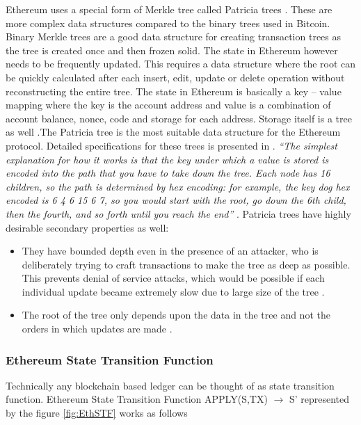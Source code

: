 Ethereum uses a special form of Merkle tree called Patricia trees \cite{ethwiki:007}. These are more complex data structures compared to the binary trees used in Bitcoin. Binary Merkle trees are a good data structure for creating transaction trees as the tree is created once and then frozen solid. The state in Ethereum however needs to be frequently updated. This requires a data structure where the root can be quickly calculated after each insert, edit, update or delete operation without reconstructing the entire tree. The state in Ethereum is basically a key – value mapping where the key is the account address and value is a combination of account balance, nonce, code and storage for each address. Storage itself is a tree as well \cite{misc:025}.The Patricia tree is the most suitable data structure for the Ethereum protocol. Detailed specifications for these trees is presented in \cite{ethwiki:007}. \textit{“The simplest explanation for how it works is that the key under which a value is stored is encoded into the path that you have to take down the tree. Each node has 16 children, so the path is determined by hex encoding: for example, the key dog hex encoded is 6 4 6 15 6 7, so you would start with the root, go down the 6th child, then the fourth, and so forth until you reach the end”} \cite{misc:025}. Patricia trees have highly desirable secondary properties as well: 
 
\begin{itemize}
\item They have bounded depth even in the presence of an attacker, who is deliberately trying to craft transactions to make the tree as deep as possible. This prevents denial of service attacks, which would be possible if each individual update became extremely slow due to large size of the tree \cite{misc:025}.  
\item The root of the tree only depends upon the data in the tree and not the orders in which updates are made \cite{misc:025}.
\end{itemize}
\clearpage

\subsubsection{Ethereum State Transition Function}
Technically any blockchain based ledger can be thought of as state transition function. Ethereum State Transition Function APPLY(S,TX) $\rightarrow$ S’ represented by the figure \ref{fig:EthSTF} works as follows \cite{eth:001}


